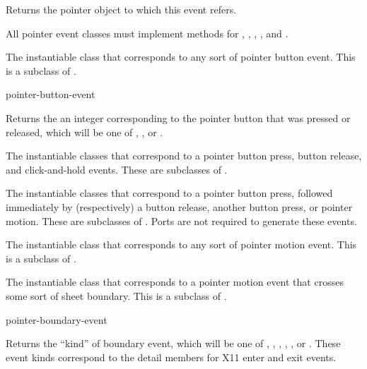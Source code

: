 Returns the pointer object to which this event refers.

All pointer event classes must implement methods for ,
, , ,
and .

 
The instantiable class that corresponds to any sort of pointer button event.
This is a subclass of .

 {pointer-button-event}

Returns the an integer corresponding to the pointer button that was pressed or
released, which will be one of ,
, or .

 
The instantiable classes that correspond to a pointer button press, button
release, and click-and-hold events.  These are subclasses of
.

 
The instantiable classes that correspond to a pointer button press, followed
immediately by (respectively) a button release, another button press, or pointer
motion.  These are subclasses of .  Ports are not
required to generate these events.

 
The instantiable class that corresponds to any sort of pointer motion event.
This is a subclass of .


The instantiable class that corresponds to a pointer motion event that crosses
some sort of sheet boundary.  This is a subclass of .

 {pointer-boundary-event}

Returns the ``kind'' of boundary event, which will be one of ,
, , , , or
.  These event kinds correspond to the detail members for X11 enter and
exit events.

